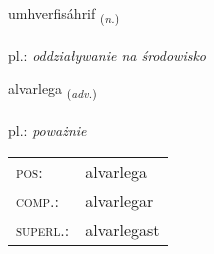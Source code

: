 \documentclass[frontgrid, backgrid]{flacards}\usepackage[]{graphicx}\usepackage[]{xcolor}
\begin{document}
\renewcommand{\blhead}{\vskip5pt {\small\bfseries\footnotesize Nafnorð | rzeczownik }}
\renewcommand{\bcfoot}{\vskip5pt \hspace{2pt}{\small\bfseries\footnotesize 3K}}


{umhverfisáhrif \small{\textsubscript{(\textit{n.})}} \\[1ex] %
\textphonetic{[ʏmkʰvɛrvɪsaur̥ɪv]} \\
pl.: \emph{oddziaływanie na środowisko} \\  [2ex]
\renewcommand*{\arraystretch}{0.8}
}

\renewcommand{\flhead}{\vskip5pt \fboxsep=0pt {\small\bfseries\footnotesize Atviksorð | przysłówek}}
\renewcommand{\fcfoot}{\vskip5pt \fboxsep=0pt \hspace{2pt}{\small\bfseries\footnotesize 3K}}

\renewcommand{\blhead}{\vskip5pt {\small\bfseries\footnotesize Atviksorð | przysłówek }}
\renewcommand{\bcfoot}{\vskip5pt \hspace{2pt}{\small\bfseries\footnotesize 3K}}


{alvarlega \small{\textsubscript{(\textit{adv.})}} \\[1ex] %
\textphonetic{[alvarlɛɣa]} \\
pl.: \emph{poważnie} \\  [2ex]
\renewcommand*{\arraystretch}{0.8}
\begin{tabular}{ll}
\textsc{pos}: & alvarlega \\ 
\textsc{comp.}: & alvarlegar \\ 
\textsc{superl.}: & alvarlegast \\
\end{tabular}
}
\end{document}
